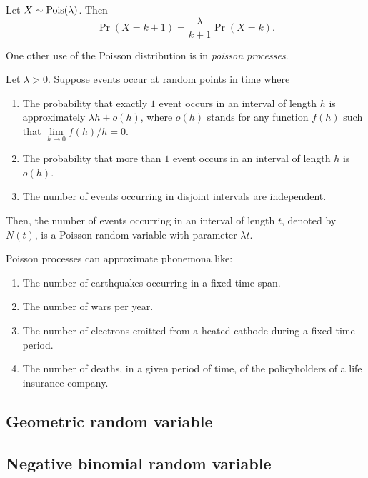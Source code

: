 \documentclass{article}
\begin{document}
\begin{proposition}[Relationship between $\Pr(X = k + 1)$ and $\Pr(X = k)$]
  Let $X \sim \textnormal{Pois}(\lambda)$.
  Then
  \[
    \Pr(X = k + 1) = \frac{\lambda}{k + 1} \Pr(X = k).
  \]
\end{proposition}

One other use of the Poisson distribution is in \emph{poisson processes}.

\begin{theorem}
  Let $\lambda > 0$.
  Suppose events occur at random points in time where
  \begin{enumerate}
    \item The probability that exactly $1$ event occurs in an interval of length $h$ is approximately $\lambda h + o(h)$, where $o(h)$ stands for any function $f(h)$ such that $\lim\limits_{h \to 0} f(h) / h = 0$.
    \item The probability that more than $1$ event occurs in an interval of length $h$ is $o(h)$.
    \item The number of events occurring in disjoint intervals are independent.
  \end{enumerate}
  Then, the number of events occurring in an interval of length $t$, denoted by $N(t)$, is a Poisson random variable with parameter $\lambda t$.
\end{theorem}

\begin{example}
  Poisson processes can approximate phonemona like:
  \begin{enumerate}
    \item The number of earthquakes occurring in a fixed time span.
    \item The number of wars per year.
    \item The number of electrons emitted from a heated cathode during a fixed time period.
    \item The number of deaths, in a given period of time, of the policyholders of a life insurance company.
  \end{enumerate}
\end{example}

\subsection{Geometric random variable}

\subsection{Negative binomial random variable}
\end{document}
